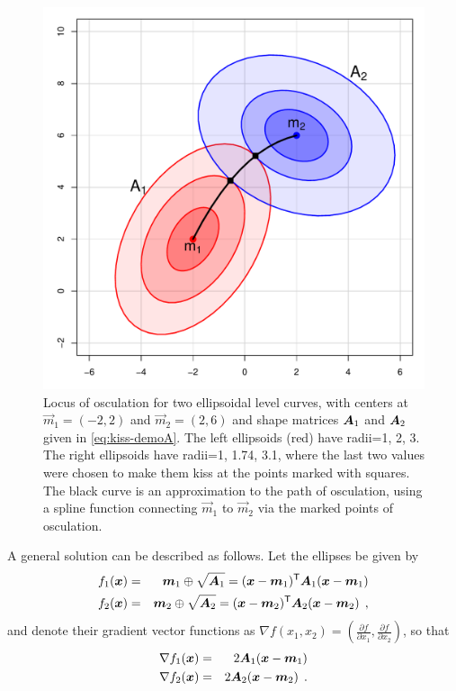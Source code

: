 \begin{figure}[htb!]
  \centering
  \includegraphics[width=.6\textwidth,clip]{fig/kiss-demo}
  \caption{Locus of osculation for two ellipsoidal level curves, with centers at $\vec{m}_1 = (-2, 2)$ and  $\vec{m}_2 = (2, 6)$
  and shape matrices $\bm{A}_1$ and $\bm{A}_2$ given in \eqref{eq:kiss-demoA}.
  The left ellipsoids (red) have radii=1, 2, 3. The right ellipsoids
  have radii=1, 1.74, 3.1, where the last two values were chosen to make them kiss at the points marked with squares. The black curve is an
  approximation to the path of osculation, using a
  spline function connecting $\vec{m}_1$ to $\vec{m}_2$ via the marked points of osculation.}%
  \label{fig:kiss-demo}
\end{figure}

A general solution can be described as follows.  Let the ellipses be given by 
\begin{eqnarray*}
f_1(\bm{x}) & = & \bm{m}_1 \oplus \sqrt{\bm{A}_1} = (\bm{x}-\bm{m}_1)^\mathsf{T} \bm{A}_1 (\bm{x}-\bm{m}_1) \\
f_2(\bm{x}) & = & \bm{m}_2 \oplus \sqrt{\bm{A}_2} = (\bm{x}-\bm{m}_2)^\mathsf{T} \bm{A}_2 (\bm{x}-\bm{m}_2) \:\: , \\
\end{eqnarray*}
and denote their gradient vector functions as $\nabla f(x_1, x_2) = \left(\frac{\partial f}{\partial x_1}, \frac{\partial f}{\partial x_2} \right) $, so that 
\begin{eqnarray*}
\nabla f_1(\bm{x}) & = & 2 \bm{A}_1 (\bm{x}-\bm{m}_1) \\
\nabla f_2(\bm{x}) & = & 2 \bm{A}_2 (\bm{x}-\bm{m}_2) \:\: . \\
\end{eqnarray*}

